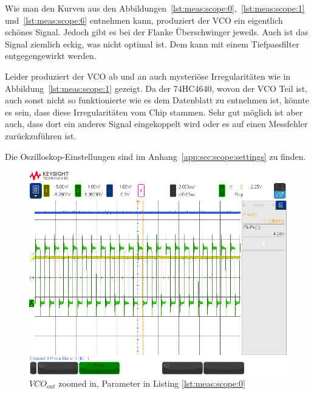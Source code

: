 Wie               man               den               Kurven               aus
den                 Abbildungen~\ref{lst:meas:scope:0},~\ref{lst:meas:scope:1}
und~\ref{lst:meas:scope:6} entnehmen  kann, produziert der VCO  ein eigentlich
sch\"ones Signal. Jedoch gibt es  bei der Flanke \"Uberschwinger jeweils. Auch
ist  das Signal  ziemlich eckig,  was nicht  optimal ist. Dem  kann mit  einem
Tiefpassfilter entgegengewirkt werden.

Leider produziert der VCO ab und an auch mysteri\"ose Irregularit\"aten wie in
Abbildung~\ref{lst:meas:scope:1} gezeigt. Da der 74HC4640,  wovon der VCO Teil
ist, auch sonst nicht so funktionierte wie es dem Datenblatt zu entnehmen ist,
k\"onnte  es sein,  dass diese  Irregularit\"aten vom  Chip stammen. Sehr  gut
m\"oglich ist aber  auch, dass dort ein anderes Signal  eingekoppelt wird oder
es auf einen Messfehler zur\"uckzuf\"uhren ist.

Die Oszilloskop-Einstellungen  sind im  Anhang~\ref{app:sec:scope:settings} zu
finden.

\begin{figure}[h!tb]
    \centering
    \includegraphics[width=1\textwidth, trim=0mm 21mm 0mm 11mm, clip]{images/scopeShots/scope_0b.png}
    \caption{$VCO_{out}$ zoomed in, Parameter in Listing \ref{lst:meas:scope:0}}
    \label{fig:meas:scope:0}
\end{figure}

